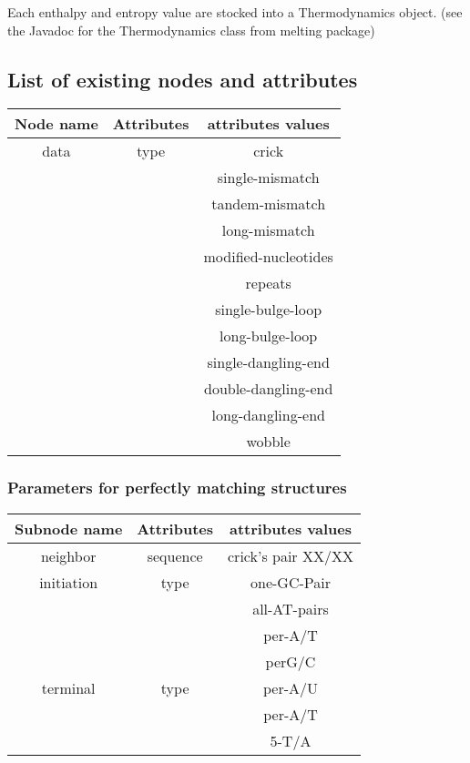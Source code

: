 \documentclass{article}
\begin{document}
Each enthalpy and entropy value are stocked into a Thermodynamics object. (see the Javadoc for the
Thermodynamics class from melting package)

\subsection{List of existing nodes and attributes}

\begin{table}[h]
\begin{tabular}[h]{| c | c | c |}
\textbf{Node name} & \textbf{Attributes} & \textbf{attributes values} \\
 \hline
data & type & crick \\
 & & single-mismatch \\
 & & tandem-mismatch \\
 & & long-mismatch \\
 & & modified-nucleotides \\
 & & repeats \\
 & & single-bulge-loop \\
 & & long-bulge-loop \\
 & & single-dangling-end \\
 & & double-dangling-end \\
 & & long-dangling-end \\
 & & wobble \\
  \hline
\end{tabular}
\end{table}

\subsubsection{Parameters for perfectly matching structures}

\begin{table}[h]
\begin{tabular}[h]{| c | c | c |}
\textbf{Subnode name} & \textbf{Attributes} & \textbf{attributes values} \\
 \hline
neighbor & sequence & crick's pair XX/XX \\
 \hline
initiation & type & one-GC-Pair \\
 & & all-AT-pairs \\
 & & per-A/T \\
 & & perG/C \\
  \hline
terminal & type & per-A/U \\
 & & per-A/T \\
 & & 5-T/A \\
  \hline
\end{tabular}
\end{table}
\end{document}
